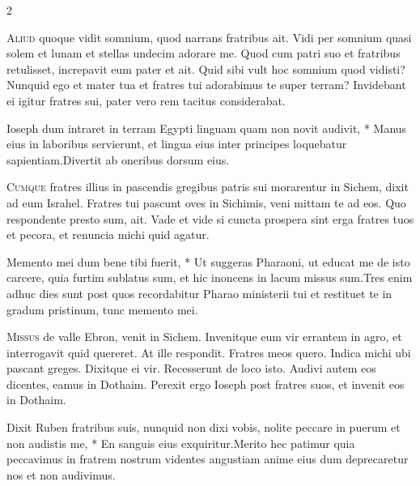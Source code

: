\begin{multicols*}{2}
\begin{responsory-final}
\end{responsory-final}%
\lettrine[lines=2]{\zallmancaps \color{Red} A}{liud} quoque vidit somnium, quod narrans fratribus ait. Vidi per somnium quasi solem et lunam et stellas undecim adorare me. Quod cum patri suo et fratribus retulisset, increpavit eum pater et ait. Quid sibi vult hoc somnium quod vidisti? Nunquid ego et mater tua et fratres tui adorabimus te super terram? Invidebant ei igitur fratres sui, pater vero rem tacitus considerabat.
\begin{responsory}
{Ioseph dum intraret in terram Egypti linguam quam non novit audivit, * Manus eius in laboribus servierunt, et lingua eius inter principes loquebatur sapientiam.}{Divertit ab oneribus dorsum eius.}
\end{responsory}%
\lettrine[lines=2]{\zallmancaps \color{Blue} C}{umque} fratres illius in pascendis gregibus patris sui morarentur in Sichem, dixit ad eum Israhel. Fratres tui pascunt oves in Sichimis, veni mittam te ad eos. Quo respondente presto sum, ait. Vade et vide si cuncta prospera sint erga fratres tuos et pecora, et renuncia michi quid agatur.
\begin{responsory}
{Memento mei dum bene tibi fuerit, * Ut suggeras Pharaoni, ut educat me de isto carcere, quia furtim sublatus sum, et hic inoncens in lacum missus sum.}{Tres enim adhuc dies sunt post quos recordabitur Pharao ministerii tui et restituet te in gradum pristinum, tunc memento mei.}
\end{responsory}%
\lettrine[lines=2]{\zallmancaps \color{Red} M}{issus} de valle Ebron, venit in Sichem. Invenitque eum vir errantem in agro, et interrogavit quid quereret. At ille respondit. Fratres meos quero. Indica michi ubi pascant greges. Dixitque ei vir. Recesserunt de loco isto. Audivi autem eos dicentes, eamus in Dothaim. Perexit ergo Ioseph post fratres suos, et invenit eos in Dothaim.
\begin{responsory-doxology}
{Dixit Ruben fratribus suis, nunquid non dixi vobis, nolite peccare in puerum et non audistis me, * En sanguis eius exquiritur.}{Merito hec patimur quia peccavimus in fratrem nostrum videntes angustiam anime eius dum deprecaretur nos et non audivimus.}
\end{responsory-doxology}%

\end{multicols*}
